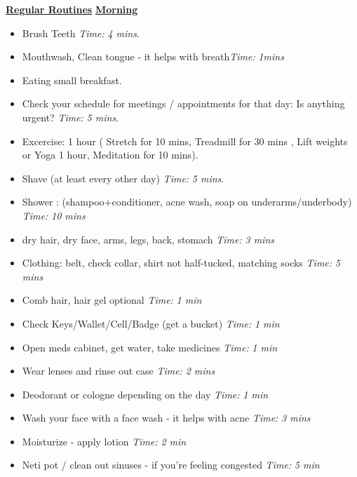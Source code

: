 \documentclass[11pt]{article}
\newcommand{\timeEst}[1]{\textit{Time:} \textit{#1}}
\begin{document}
              {\small \textbf{\underline{Regular Routines}} 
                \underline{\textbf{Morning}}
                \begin{itemize}
                  \tiny \item \tiny Brush Teeth \timeEst{4 mins}.
                \item \tiny Mouthwash, Clean tongue - it helps with breath\timeEst{1mins}
                \item \tiny Eating small breakfast.
                \item \tiny Check your schedule for meetings / appointments for that day: Is anything urgent? \timeEst{5 mins}.
                \item \tiny Excercise: 1 hour ( Stretch for 10 mins, Treadmill for 30 mins , Lift weights or Yoga 1 hour, Meditation for 10 mins).
                \item \tiny Shave (at least every other day) \timeEst{5 mins}.
                \item \tiny Shower : (shampoo+conditioner, acne wash,  soap on underarms/underbody)
                  \timeEst{10 mins}
                \item \tiny dry hair, dry face, arms, legs, back, stomach \timeEst{3 mins}
                \item \tiny Clothing: belt, check collar, shirt not half-tucked, matching socks \timeEst{5 mins}
                \item \tiny Comb hair, hair gel optional \timeEst{ 1 min}
                \item \tiny Check Keys/Wallet/Cell/Badge (get a bucket) \timeEst{1 min}
                \item \tiny Open meds cabinet, get water, take medicines \timeEst{1 min}
                \item \tiny Wear lenses and rinse out case \timeEst{ 2 mins}
                \item \tiny Deodorant or cologne depending on the day \timeEst{1 min}
                \item \tiny Wash your face with a face wash - it helps with acne \timeEst{3 mins}
                \item \tiny Moisturize - apply lotion \timeEst{ 2 min}
                \item \tiny Neti pot / clean out sinuses - if you’re feeling congested \timeEst{5 min}

\end{itemize}}
\end{document}

